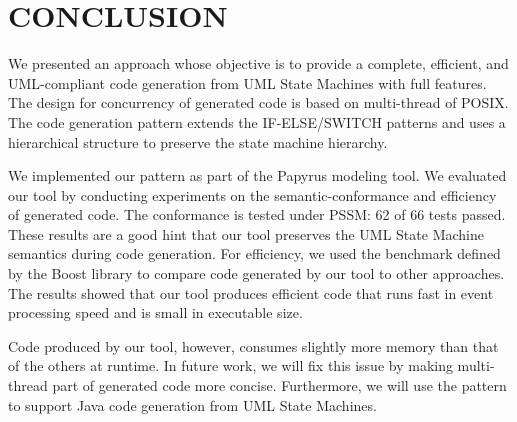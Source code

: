 \section{\uppercase{Conclusion}}
\label{sec:conclusion}
We presented an approach whose objective is to provide a complete, efficient, and UML-compliant code generation from UML State Machines with full features. 
The design for concurrency of generated code is based on multi-thread of POSIX.
The code generation pattern extends the IF-ELSE/SWITCH patterns and uses a hierarchical structure to preserve the state machine hierarchy. 

We implemented our pattern as part of the Papyrus modeling tool. 
We evaluated our tool by conducting experiments on the semantic-conformance and efficiency of generated code.
The conformance is tested under PSSM: 62 of 66 tests passed.
These results are a good hint that our tool preserves the UML State Machine semantics during code generation.
For efficiency, we used the benchmark defined by the Boost library to compare code generated by our tool to other approaches.
The results showed that our tool produces efficient code that runs fast in event processing speed and is small in executable size.

Code produced by our tool, however, consumes slightly more memory than that of the others at runtime.
In future work, we will fix this issue by making multi-thread part of generated code more concise.  
Furthermore, we will use the pattern to support Java code generation from UML State Machines. 